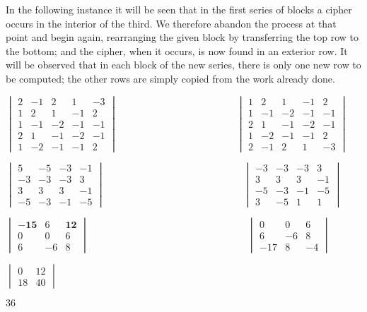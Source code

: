 \documentclass[11pt]{article}%
\theoremstyle{definition}
\begin{document}
\bigskip

\textsf{In the following instance it will be seen that in the first series of
blocks a cipher occurs in the interior of the third. We therefore abandon the
process at that point and begin again, rearranging the given block by
transferring the top row to the bottom; and the cipher, when it occurs, is now
found in an exterior row. It will be observed}\textit{ }\textsf{that in each
block of the new series, there is only one new row to be computed; the other
rows are simply copied from the work already done.}

\begin{center}
$%
\begin{vmatrix}
2 & -1 & 2 & 1 & -3\\
1 & 2 & 1 & -1 & 2\\
1 & -1 & -2 & -1 & -1\\
2 & 1 & -1 & -2 & -1\\
1 & -2 & -1 & -1 & 2
\end{vmatrix}
\mathsf{\qquad\qquad\qquad\qquad\qquad\qquad}%
\begin{vmatrix}
1 & 2 & 1 & -1 & 2\\
1 & -1 & -2 & -1 & -1\\
2 & 1 & -1 & -2 & -1\\
1 & -2 & -1 & -1 & 2\\
2 & -1 & 2 & 1 & -3
\end{vmatrix}
$

$%
\begin{vmatrix}
5 & -5 & -3 & -1\\
-3 & -3 & -3 & 3\\
3 & 3 & 3 & -1\\
-5 & -3 & -1 & -5
\end{vmatrix}
\mathsf{\qquad\qquad\qquad\qquad\qquad\qquad\qquad}%
\begin{vmatrix}
-3 & -3 & -3 & 3\\
3 & 3 & 3 & -1\\
-5 & -3 & -1 & -5\\
3 & -5 & 1 & 1
\end{vmatrix}
$

$%
\begin{vmatrix}
\mathbf{-15} & 6 & \mathbf{12}\\
0 & 0 & 6\\
6 & -6 & 8
\end{vmatrix}
\mathsf{\qquad\qquad\qquad\qquad\qquad\qquad\qquad\qquad}%
\begin{vmatrix}
0 & 0 & 6\\
6 & -6 & 8\\
-17 & 8 & -4
\end{vmatrix}
$

\textsf{\qquad\qquad\qquad\qquad\qquad\qquad\qquad\qquad\qquad\qquad
\qquad\qquad}$%
\begin{vmatrix}
0 & 12\\
18 & 40
\end{vmatrix}
$

\textsf{\qquad\qquad\qquad\qquad\qquad\qquad\qquad\qquad\qquad\qquad
\qquad\qquad}$36$


\end{center}
\end{document}
